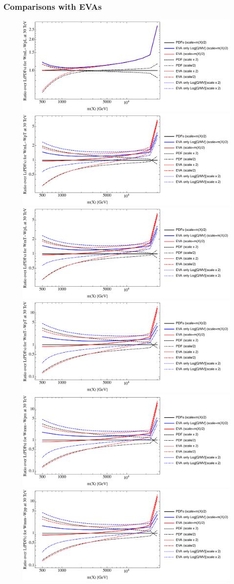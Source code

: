\documentclass[a4paper,11pt]{article}
\begin{document}
\clearpage
\subsubsection{Comparisons with EVAs}


\begin{figure}[ht]
\includegraphics[width=0.46\linewidth]{Notebooks/PlotLumi/30TeV/ratios/WmL-WpL.pdf}
\includegraphics[width=0.46\linewidth]{Notebooks/PlotLumi/30TeV/ratios/WmL-WpT.pdf}
\includegraphics[width=0.46\linewidth]{Notebooks/PlotLumi/30TeV/ratios/WmT-WpL.pdf}
\includegraphics[width=0.46\linewidth]{Notebooks/PlotLumi/30TeV/ratios/WmT-WpT.pdf}
\includegraphics[width=0.46\linewidth]{Notebooks/PlotLumi/30TeV/ratios/Wmm-Wpm.pdf}
\includegraphics[width=0.46\linewidth]{Notebooks/PlotLumi/30TeV/ratios/Wmm-Wpp.pdf}
\end{figure}
\end{document}
